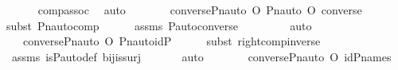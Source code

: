 \begin{isabellebody}
\ \ \ \ \isamarkupfalse%
\ comp{\isacharunderscore}{\kern0pt}assoc\ \isamarkupfalse%
\ auto\isanewline
\ \ \isamarkupfalse%
\ \isamarkupfalse%
\ {\isachardoublequoteopen}{\isachardot}{\kern0pt}{\isachardot}{\kern0pt}{\isachardot}{\kern0pt}\ {\isacharequal}{\kern0pt}\ converse{\isacharparenleft}{\kern0pt}Pn{\isacharunderscore}{\kern0pt}auto{\isacharparenleft}{\kern0pt}{\isasympi}{\isacharparenright}{\kern0pt}{\isacharparenright}{\kern0pt}\ O\ Pn{\isacharunderscore}{\kern0pt}auto{\isacharparenleft}{\kern0pt}{\isasympi}\ O\ converse{\isacharparenleft}{\kern0pt}{\isasympi}{\isacharparenright}{\kern0pt}{\isacharparenright}{\kern0pt}{\isachardoublequoteclose}\ \isanewline
\ \ \ \ \isamarkupfalse%
{\isacharparenleft}{\kern0pt}subst\ Pn{\isacharunderscore}{\kern0pt}auto{\isacharunderscore}{\kern0pt}comp{\isacharparenright}{\kern0pt}\isanewline
\ \ \ \ \isamarkupfalse%
\ assms\ P{\isacharunderscore}{\kern0pt}auto{\isacharunderscore}{\kern0pt}converse\ \ \ \isanewline
\ \ \ \ \isamarkupfalse%
\ auto\ \isanewline
\ \ \isamarkupfalse%
\ \isamarkupfalse%
\ {\isachardoublequoteopen}{\isachardot}{\kern0pt}{\isachardot}{\kern0pt}{\isachardot}{\kern0pt}\ {\isacharequal}{\kern0pt}\ converse{\isacharparenleft}{\kern0pt}Pn{\isacharunderscore}{\kern0pt}auto{\isacharparenleft}{\kern0pt}{\isasympi}{\isacharparenright}{\kern0pt}{\isacharparenright}{\kern0pt}\ O\ Pn{\isacharunderscore}{\kern0pt}auto{\isacharparenleft}{\kern0pt}id{\isacharparenleft}{\kern0pt}P{\isacharparenright}{\kern0pt}{\isacharparenright}{\kern0pt}{\isachardoublequoteclose}\ \isanewline
\ \ \ \ \isamarkupfalse%
{\isacharparenleft}{\kern0pt}subst\ right{\isacharunderscore}{\kern0pt}comp{\isacharunderscore}{\kern0pt}inverse{\isacharparenright}{\kern0pt}\isanewline
\ \ \ \ \isamarkupfalse%
\ assms\ is{\isacharunderscore}{\kern0pt}P{\isacharunderscore}{\kern0pt}auto{\isacharunderscore}{\kern0pt}def\ bij{\isacharunderscore}{\kern0pt}is{\isacharunderscore}{\kern0pt}surj\ \isanewline
\ \ \ \ \isamarkupfalse%
\ auto\isanewline
\ \ \isamarkupfalse%
\ \isamarkupfalse%
\ {\isachardoublequoteopen}{\isachardot}{\kern0pt}{\isachardot}{\kern0pt}{\isachardot}{\kern0pt}\ {\isacharequal}{\kern0pt}\ converse{\isacharparenleft}{\kern0pt}Pn{\isacharunderscore}{\kern0pt}auto{\isacharparenleft}{\kern0pt}{\isasympi}{\isacharparenright}{\kern0pt}{\isacharparenright}{\kern0pt}\ O\ id{\isacharparenleft}{\kern0pt}P{\isacharunderscore}{\kern0pt}names{\isacharparenright}{\kern0pt}{\isachardoublequoteclose}\ \isanewline

\end{isabellebody}
